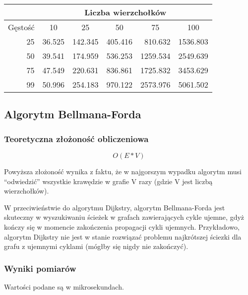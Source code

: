 \documentclass[12pt]{article}
\begin{document}
\begin{center}
\begin{tabular}{|r|r|r|r|r|r|}
\hline
                              & \multicolumn{5}{c|}{Liczba wierzchołków}                                                                                         \\ \hline
\multicolumn{1}{|c|}{Gęstość} & \multicolumn{1}{c|}{10} & \multicolumn{1}{c|}{25} & \multicolumn{1}{c|}{50} & \multicolumn{1}{c|}{75} & \multicolumn{1}{c|}{100} \\ \hline
25                  & 36.525 & 142.345 & 405.416 & 810.632  & 1536.803 \\ \hline
50                  & 39.541 & 174.959 & 536.253 & 1259.534 & 2549.639 \\ \hline
75                  & 47.549 & 220.631 & 836.861 & 1725.832 & 3453.629 \\ \hline
99                  & 50.996 & 254.183 & 970.122 & 2573.976 & 5061.502 \\ \hline
\end{tabular}
\end{center}


\subsection{Algorytm Bellmana-Forda}
\subsubsection{Teoretyczna złożoność obliczeniowa}

{\Large\[ O(E*V) \]}

Powyższa złożoność wynika z faktu, że w najgorszym wypadku algorytm musi ``odwiedzić'' wszystkie krawędzie w grafie V razy (gdzie V jest liczbą wierzchołków).

W przeciwieństwie do algorytmu Dijkstry, algorytm Bellmana-Forda jest skuteczny w wyszukiwaniu ścieżek w grafach zawierających cykle ujemne, gdyż kończy się w momencie zakończenia propagacji cykli ujemnych. Przykładowo, algorytm Dijkstry nie jest w stanie rozwiązać problemu najkrótszej ściezki dla grafu z ujemnymi cyklami (mógłby się nigdy nie zakończyć). 
\newpage
\subsubsection{Wyniki pomiarów}

Wartości podane są w mikrosekundach.
\end{document}
